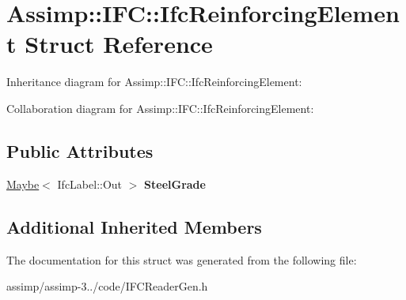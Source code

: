 \hypertarget{struct_assimp_1_1_i_f_c_1_1_ifc_reinforcing_element}{\section{Assimp\+:\+:I\+F\+C\+:\+:Ifc\+Reinforcing\+Element Struct Reference}
\label{struct_assimp_1_1_i_f_c_1_1_ifc_reinforcing_element}
}


Inheritance diagram for Assimp\+:\+:I\+F\+C\+:\+:Ifc\+Reinforcing\+Element\+:


Collaboration diagram for Assimp\+:\+:I\+F\+C\+:\+:Ifc\+Reinforcing\+Element\+:
\subsection*{Public Attributes}
\begin{DoxyCompactItemize}
\item 
\hypertarget{struct_assimp_1_1_i_f_c_1_1_ifc_reinforcing_element_a159411e22bdfdc3f7d2adb2e4a61f748}{\hyperlink{struct_assimp_1_1_s_t_e_p_1_1_maybe}{Maybe}$<$ Ifc\+Label\+::\+Out $>$ {\bfseries Steel\+Grade}}\label{struct_assimp_1_1_i_f_c_1_1_ifc_reinforcing_element_a159411e22bdfdc3f7d2adb2e4a61f748}

\end{DoxyCompactItemize}
\subsection*{Additional Inherited Members}


The documentation for this struct was generated from the following file\+:\begin{DoxyCompactItemize}
\item 
assimp/assimp-\/3../code/I\+F\+C\+Reader\+Gen.\+h\end{DoxyCompactItemize}
